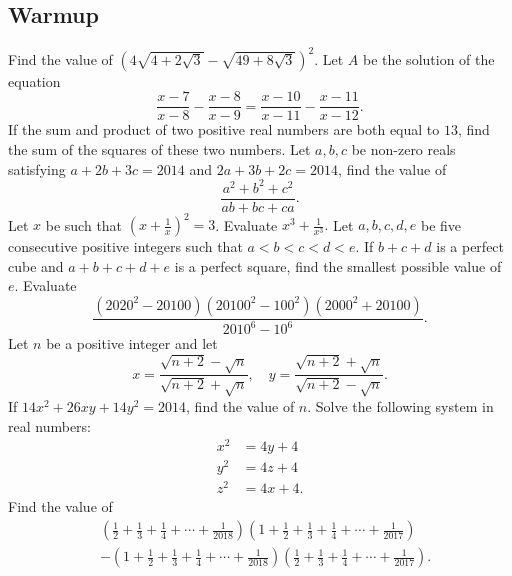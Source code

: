 \documentclass[../jarvis.tex]{subfiles}
\begin{document}
\subsection{Warmup}
\problem[2015 SMO(J) P9]Find the value of $\left(4\sqrt{4+2\sqrt{3}}-\sqrt{49+8\sqrt{3}}\right)^2.$
\problem[2014 SMO(J) P13]Let $A$ be the solution of the equation
$$\frac{x-7}{x-8}-\frac{x-8}{x-9}=\frac{x-10}{x-11}-\frac{x-11}{x-12}.$$
\problem[2016 SMO(J) P11]If the sum and product of two positive real numbers are both equal to $13$, find the sum of the squares of these two numbers.
\problem[2014 SMO(J) P23]Let $a,b,c$ be non-zero reals satisfying $a+2b+3c=2014$ and $2a+3b+2c=2014$, find the value of 
$$\frac{a^2+b^2+c^2}{ab+bc+ca}.$$
\problem[2014 SMO(J) P26]Let $x$ be such that $\left(x+\frac{1}{x}\right)^2=3$. Evaluate $x^3+\frac{1}{x^3}.$
\problem[2014/15 SDML 2A/P5]Let $a,b,c,d,e$ be five consecutive positive integers such that $a<b<c<d<e$. If $b+c+d$ is a perfect cube and $a+b+c+d+e$ is a perfect square, find the smallest possible value of $e$.
\problem[2008 SMO(J) P23]Evaluate 
$$\frac{(2020^2-20100)(20100^2-100^2)(2000^2+20100)}{2010^6-10^6}.$$
\problem[2014 SMO(S) P23]Let $n$ be a positive integer and let
$$x=\frac{\sqrt{n+2}-\sqrt{n}}{\sqrt{n+2}+\sqrt{n}},\quad y=\frac{\sqrt{n+2}+\sqrt{n}}{\sqrt{n+2}-\sqrt{n}}.$$
If $14x^2+26xy+14y^2=2014$, find the value of $n$.
\problem[2014 SMO(S) P29]Solve the following system in real numbers:
\begin{align*}
    x^2&=4y+4 \\
    y^2&=4z+4 \\
    z^2&=4x+4.
\end{align*}
\problem[2018 SMO(J) P2]Find the value of \begin{align*}
    &\left(\frac{1}{2}+\frac{1}{3}+\frac{1}{4}+\cdots+\frac{1}{2018}\right)\left(1+\frac{1}{2}+\frac{1}{3}+\frac{1}{4}+\cdots+\frac{1}{2017}\right) \\
    &-\left(1+\frac{1}{2}+\frac{1}{3}+\frac{1}{4}+\cdots+\frac{1}{2018}\right)\left(\frac{1}{2}+\frac{1}{3}+\frac{1}{4}+\cdots+\frac{1}{2017}\right).
\end{align*}
\end{document}

